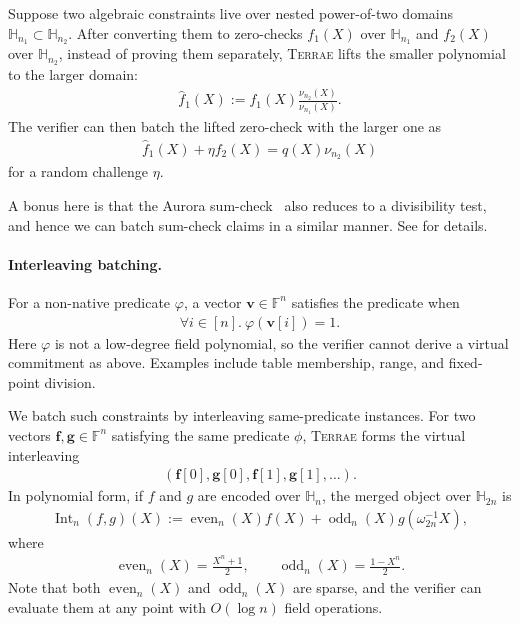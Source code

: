 Suppose two algebraic constraints live over nested power-of-two domains
$\mathbb{H}_{n_1}\subset \mathbb{H}_{n_2}$.
After converting them to zero-checks $f_1(X)$
over $\mathbb{H}_{n_1}$ and $f_2(X)$ over $\mathbb{H}_{n_2}$, instead of proving
them separately, \textsc{Terrae} lifts the smaller polynomial to the larger
domain:
\begin{align}
    \widehat{f}_1(X)
    :=
    f_1(X)\frac{\nu_{n_2}(X)}{\nu_{n_1}(X)}.
\end{align}
The verifier can then batch the lifted zero-check with the larger one as
\begin{align}
    \widehat{f}_1(X)+\eta f_2(X)=q(X)\nu_{n_2}(X)
\end{align}
for a random challenge $\eta$.

A bonus here is that the Aurora sum-check~\cite{aurora19}
also reduces to a divisibility test,
and hence we can batch sum-check claims
in a similar manner. See  for details.

\paragraph{Interleaving batching.}
For a non-native predicate $\varphi$, a vector
$\mathbf{v}\in \mathbb{F}^n$ satisfies the predicate when
\begin{align}
    \forall i\in [n].\ \varphi(\mathbf{v}[i])=1.
\end{align}
Here $\varphi$ is not a low-degree field polynomial, so the verifier cannot
derive a virtual commitment as above. Examples include table
membership, range, and fixed-point division.

We batch such constraints by
interleaving same-predicate instances. For two vectors
$\mathbf{f},\mathbf{g}\in\mathbb{F}^n$ satisfying the same predicate $\phi$,
\textsc{Terrae} forms the virtual interleaving
\begin{align}
    (\mathbf{f}[0],\mathbf{g}[0],\mathbf{f}[1],\mathbf{g}[1],\ldots).
\end{align}
In polynomial form, if $f$ and $g$ are encoded over $\mathbb{H}_n$, the merged
object over $\mathbb{H}_{2n}$ is
\begin{align}
    \operatorname{Int}_n(f,g)(X)
    :=
    \operatorname{even}_n(X)f(X)
    +\operatorname{odd}_n(X)g(\omega_{2n}^{-1}X),
\end{align}
where
\begin{align}
    \operatorname{even}_n(X)=\frac{X^n+1}{2},
    \qquad
    \operatorname{odd}_n(X)=\frac{1-X^n}{2}.
\end{align}
Note that both $\operatorname{even}_n(X)$ and $\operatorname{odd}_n(X)$ are sparse, and the verifier
can evaluate them at any point with $O(\log n)$ field operations.

